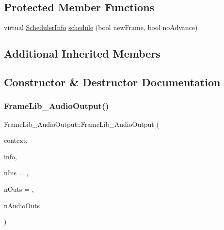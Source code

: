 \subsection*{Protected Member Functions}
\begin{DoxyCompactItemize}
\item 
virtual \hyperlink{struct_frame_lib___d_s_p_1_1_scheduler_info}{Scheduler\+Info} \hyperlink{class_frame_lib___audio_output_a39e97cc3e92147465cf1f6c267de185d}{schedule} (bool new\+Frame, bool no\+Advance)
\end{DoxyCompactItemize}
\subsection*{Additional Inherited Members}


\subsection{Constructor \& Destructor Documentation}
\mbox{\label{class_frame_lib___audio_output_a80e661b08a8daa5a18b44df01f8d4226}} 
\subsubsection{\texorpdfstring{Frame\+Lib\+\_\+\+Audio\+Output()}{FrameLib\_AudioOutput()}}
{\footnotesize\ttfamily Frame\+Lib\+\_\+\+Audio\+Output\+::\+Frame\+Lib\+\_\+\+Audio\+Output (\begin{DoxyParamCaption}\item[{\hyperlink{class_frame_lib___context}{Frame\+Lib\+\_\+\+Context}}]{context,  }\item[{\hyperlink{class_frame_lib___parameters_1_1_info}{Frame\+Lib\+\_\+\+Parameters\+::\+Info} $\ast$}]{info,  }\item[{unsigned long}]{n\+Ins = {},  }\item[{unsigned long}]{n\+Outs = {},  }\item[{unsigned long}]{n\+Audio\+Outs = {} }\end{DoxyParamCaption})\hspace{0.3cm}{\ttfamily [inline]}}



